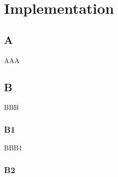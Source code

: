 
%
%
%


\chapter{Implementation}
\label{ch:Implementation}

%




\section{A}

AAA


\section{B}

BBB

\subsection{B1}

BBB1

\subsection{B2}

